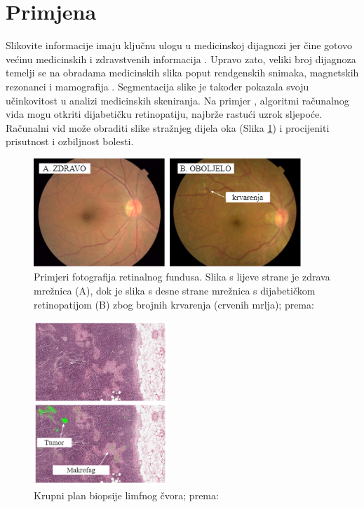 \documentclass[]{foi} %
\begin{document}
\newpage
\section{Primjena}

Slikovite informacije imaju ključnu ulogu u medicinskoj dijagnozi jer čine gotovo većinu medicinskih i zdravstvenih informacija \cite{adobe}. Upravo zato, veliki broj dijagnoza temelji se na obradama medicinskih slika poput rendgenskih snimaka, magnetskih rezonanci i mamografija \cite{adobe}. Segmentacija slike je također pokazala svoju učinkovitost u analizi medicinskih skeniranja. Na primjer \cite{adobe}, algoritmi računalnog vida mogu otkriti dijabetičku retinopatiju, najbrže rastući uzrok sljepoće. Računalni vid može obraditi slike stražnjeg dijela oka (Slika \ref{fig:oko}) i procijeniti prisutnost i ozbiljnost bolesti.

\begin{figure}[!ht]
    \centering
    \includegraphics[width=0.9\textwidth]{slike/oko.png}
    \caption{Primjeri fotografija retinalnog fundusa. Slika s lijeve strane je zdrava mrežnica (A), dok je slika s desne strane mrežnica s dijabetičkom retinopatijom (B) zbog brojnih krvarenja (crvenih mrlja); prema: \cite{google1}}
    \label{fig:oko}
\end{figure}

\begin{figure}[!ht]
    \centering
    \includegraphics[width=0.45\textwidth]{slike/tumor.png}
    \caption{Krupni plan biopsije limfnog čvora; prema: \cite{google2}}
    \label{fig:tumor}
\end{figure}
\end{document}
